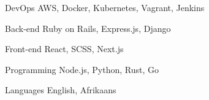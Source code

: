 

\begin{cvskills}

  \cvskill
    {DevOps} %
    {AWS, Docker, Kubernetes, Vagrant, Jenkins} %

  \cvskill
    {Back-end} %
    {Ruby on Rails, Express.js, Django} %

  \cvskill
    {Front-end} %
    {React, SCSS, Next.js}%

  \cvskill
    {Programming} %
    {Node.js, Python, Rust, Go} %

  \cvskill
    {Languages} %
    {English, Afrikaans} %

\end{cvskills}
